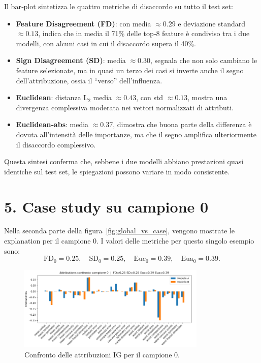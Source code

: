 \documentclass[a4paper,11pt]{article}
\begin{document}
Il bar‐plot sintetizza le quattro metriche di disaccordo su tutto il test set:
\begin{itemize}
  \item \textbf{Feature Disagreement (FD)}: con media $\approx0.29$ e deviazione standard $\approx0.13$, indica che in media il 71\% delle top‐8 feature è condiviso tra i due modelli, con alcuni casi in cui il disaccordo supera il 40\%.
  \item \textbf{Sign Disagreement (SD)}: media $\approx0.30$, segnala che non solo cambiano le feature selezionate, ma in quasi un terzo dei casi si inverte anche il segno dell’attribuzione, ossia il “verso” dell’influenza.
  \item \textbf{Euclidean}: distanza L$_2$ media $\approx0.43$, con std $\approx0.13$, mostra una divergenza complessiva moderata nei vettori normalizzati di attributi.
  \item \textbf{Euclidean‐abs}: media $\approx0.37$, dimostra che buona parte della differenza è dovuta all’intensità delle importanze, ma che il segno amplifica ulteriormente il disaccordo complessivo.
\end{itemize}

Questa sintesi conferma che, sebbene i due modelli abbiano prestazioni quasi identiche sul test set, le spiegazioni possono variare in modo consistente.


\section*{5. Case study su campione 0}
Nella seconda parte della figura~\ref{fig:global_vs_case}, vengono mostrate le explanation per il campione 0. I valori delle metriche per questo singolo esempio sono:
\[
\text{FD}_0 = 0.25,\quad
\text{SD}_0 = 0.25,\quad
\text{Euc}_0 = 0.39,\quad
\text{Eua}_0 = 0.39.
\]

\begin{figure}[htbp]
  \centering
  \includegraphics[width=0.8\textwidth]{campione zero.png}
  \caption{Confronto delle attribuzioni IG per il campione 0.}
  \label{fig:campione_zero.png}
\end{figure}
\end{document}
